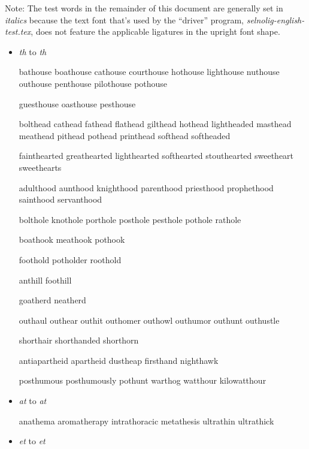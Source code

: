 \bigskip

Note: The test words in the remainder of this document are generally set in \emph{italics} because the text font that's used by the ``driver'' program, \emph{selnolig-english-test.tex}, does not feature the applicable ligatures in the upright font shape.


\begin{itemize}

\item \emph{th} to \emph{t\hspace{0pt}h}

\bgroup \em

bathouse boathouse cathouse courthouse hothouse lighthouse nuthouse outhouse penthouse pilothouse pothouse

guesthouse oasthouse pesthouse 

bolthead cathead fathead flathead gilthead hothead lightheaded masthead meathead pithead pothead printhead softhead softheaded

fainthearted greathearted lighthearted softhearted stouthearted sweetheart sweethearts

adulthood aunthood knighthood parenthood priesthood prophethood sainthood servanthood

bolthole knothole porthole posthole pesthole pothole rathole

boathook meathook pothook

foothold potholder roothold

anthill foothill

goatherd neatherd

outhaul outhear outhit outhomer outhowl outhumor outhunt outhustle

shorthair shorthanded shorthorn %

antiapartheid apartheid dustheap firsthand nighthawk

posthumous posthumously pothunt warthog watthour kilowatthour




\egroup


\item \emph{at} to \emph{a\hspace{0pt}t}

\bgroup \em

anathema aromatherapy intrathoracic metathesis ultrathin ultrathick 
\egroup

\item \emph{et} to \emph{e\hspace{0pt}t}


\end{itemize}
